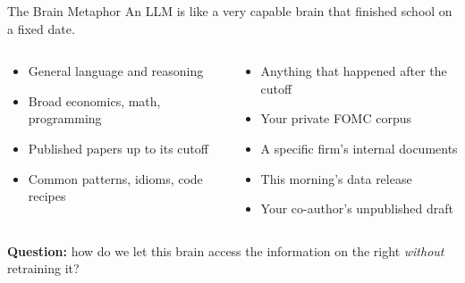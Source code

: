 \documentclass[10pt,english,aspectratio=169]{beamer}
\begin{document}
\begin{frame}{The Brain Metaphor}
An LLM is like a very capable brain that finished school on a fixed date.

\medskip
\begin{columns}[T]
\begin{tcolorbox}[colback=green!5, colframe=green!40!black, title=\textbf{What the brain knows}]
\begin{itemize}
\item General language and reasoning
\item Broad economics, math, programming
\item Published papers up to its cutoff
\item Common patterns, idioms, code recipes
\end{itemize}
\end{tcolorbox}

\begin{tcolorbox}[colback=red!5, colframe=red!50!black, title=\textbf{What the brain does \emph{not} know}]
\begin{itemize}
\item Anything that happened after the cutoff
\item Your private FOMC corpus
\item A specific firm's internal documents
\item This morning's data release
\item Your co-author's unpublished draft
\end{itemize}
\end{tcolorbox}
\end{columns}

\medskip
\textbf{Question:} how do we let this brain access the information on the right \emph{without} retraining it?
\end{frame}
\end{document}
